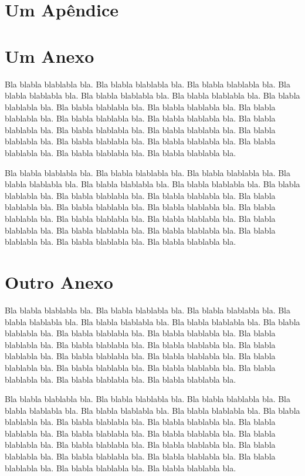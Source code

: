 \documentclass[tcc,capa]{texufpel}
\begin{document}

 

\apendices
\chapter{Um Apêndice}

\anexos
\chapter{Um Anexo}

Bla blabla blablabla bla.  Bla blabla blablabla bla.  Bla blabla
blablabla bla.  Bla blabla blablabla bla.  Bla blabla blablabla bla.
Bla blabla blablabla bla.  Bla blabla blablabla bla.  Bla blabla
blablabla bla.  Bla blabla blablabla bla.  Bla blabla blablabla bla.
Bla blabla blablabla bla.  Bla blabla blablabla bla.  Bla blabla
blablabla bla.  Bla blabla blablabla bla.  Bla blabla blablabla bla.
Bla blabla blablabla bla.  Bla blabla blablabla bla.  Bla blabla
blablabla bla.  Bla blabla blablabla bla.  Bla blabla blablabla bla.
Bla blabla blablabla bla.

Bla blabla blablabla bla.  Bla blabla blablabla bla.  Bla blabla
blablabla bla.  Bla blabla blablabla bla.  Bla blabla blablabla bla.
Bla blabla blablabla bla.  Bla blabla blablabla bla.  Bla blabla
blablabla bla.  Bla blabla blablabla bla.  Bla blabla blablabla bla.
Bla blabla blablabla bla.  Bla blabla blablabla bla.  Bla blabla
blablabla bla.  Bla blabla blablabla bla.  Bla blabla blablabla bla.
Bla blabla blablabla bla.  Bla blabla blablabla bla.  Bla blabla
blablabla bla.  Bla blabla blablabla bla.  Bla blabla blablabla bla.
Bla blabla blablabla bla.

\chapter{Outro Anexo}

Bla blabla blablabla bla.  Bla blabla blablabla bla.  Bla blabla
blablabla bla.  Bla blabla blablabla bla.  Bla blabla blablabla bla.
Bla blabla blablabla bla.  Bla blabla blablabla bla.  Bla blabla
blablabla bla.  Bla blabla blablabla bla.  Bla blabla blablabla bla.
Bla blabla blablabla bla.  Bla blabla blablabla bla.  Bla blabla
blablabla bla.  Bla blabla blablabla bla.  Bla blabla blablabla bla.
Bla blabla blablabla bla.  Bla blabla blablabla bla.  Bla blabla
blablabla bla.  Bla blabla blablabla bla.  Bla blabla blablabla bla.
Bla blabla blablabla bla.

Bla blabla blablabla bla.  Bla blabla blablabla bla.  Bla blabla
blablabla bla.  Bla blabla blablabla bla.  Bla blabla blablabla bla.
Bla blabla blablabla bla.  Bla blabla blablabla bla.  Bla blabla
blablabla bla.  Bla blabla blablabla bla.  Bla blabla blablabla bla.
Bla blabla blablabla bla.  Bla blabla blablabla bla.  Bla blabla
blablabla bla.  Bla blabla blablabla bla.  Bla blabla blablabla bla.
Bla blabla blablabla bla.  Bla blabla blablabla bla.  Bla blabla
blablabla bla.  Bla blabla blablabla bla.  Bla blabla blablabla bla.
Bla blabla blablabla bla.
\end{document}
